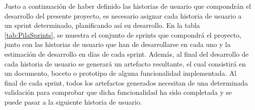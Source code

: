 Justo a continuación de haber definido las historias de usuario que compondrán el desarrollo del presente proyecto, es necesario asignar cada historia de usuario a un sprint determinado, planificando así su desarrollo. En la tabla \ref{tab:PilaSprints}, se muestra el conjunto de sprints que compondrá el proyecto, junto con las historias de usuario que han de desarrollarse en cada uno y la estimación de desarrollo en días de cada sprint. Además, al final del desarrollo de cada historia de usuario se generará un artefacto resultante, el cual consistirá en un documento, boceto o prototipo de alguna funcionalidad implementada. Al final de cada sprint, todos los artefactos generados necesitan de una determinada validación para comprobar que dicha funcionalidad ha sido completada y se puede pasar a la siguiente historia de usuario.

